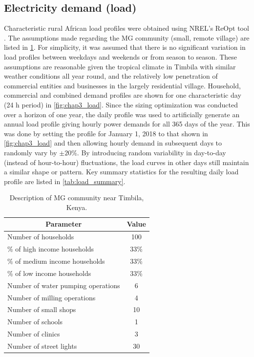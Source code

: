 \documentclass[final,3p,times]{elsarticle}
\begin{document}
\subsection{Electricity demand (load)}

Characteristic rural African load profiles were obtained using NREL's ReOpt tool \cite{nrel_data}. The assumptions made regarding the MG community (small, remote village) are listed in \cref{tab:load}. For simplicity, it was assumed that there is no significant variation in load profiles between weekdays and weekends or from season to season. These assumptions are reasonable given the tropical climate in Timbila with similar weather conditions all year round, and the relatively low penetration of commercial entities and businesses in the largely residential village. Household, commercial and combined demand profiles are shown for one characteristic day (24 h period) in \cref{fig:chap3_load}. Since the sizing optimization was conducted over a horizon of one year, the daily profile was used to artificially generate an annual load profile giving hourly power demands for all 365 days of the year. This was done by setting the profile for January 1, 2018 to that shown in \cref{fig:chap3_load} and then allowing hourly demand in subsequent days to randomly vary by $\pm 20\%$. By introducing random variability in day-to-day (instead of hour-to-hour) fluctuations, the load curves in other days still maintain a similar shape or pattern. Key summary statistics for the resulting daily load profile are listed in \cref{tab:load_summary}. 

\begin{table}[htbp] 
\centering
\begin{tabular}{@{}lc@{}}
\toprule
\multicolumn{1}{c}{\textbf{Parameter}} & \textbf{Value}       \\ 
\midrule
Number of households & 100 \\
\% of high income households & 33\% \\
\% of medium income households & 33\% \\
\% of low income households & 33\% \\
Number of water pumping operations & 6 \\
Number of milling operations & 4 \\
Number of small shops & 10 \\
Number of schools & 1 \\
Number of clinics & 3 \\
Number of street lights & 30 \\
\bottomrule
\end{tabular}
\caption{Description of MG community near Timbila, Kenya.}
\label{tab:load}
\end{table}
\end{document}

